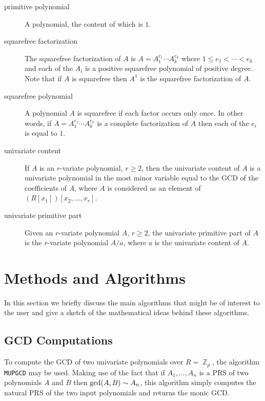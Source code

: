 \begin{description}
  \item[primitive polynomial]
 A polynomial, the content of which is
$1$.

  \item[squarefree
factorization]
 The squarefree factorization of $A$
is $A = A_1^{e_1}\cdots A_k^{e_k}$ where $1 \leq e_1 < \cdots < e_k$
and each of the $A_i$ is a positive squarefree polynomial of positive
degree.  Note that if $A$ is squarefree then $A^1$ is the
squarefree factorization of $A$.

  \item[squarefree polynomial]
 A polynomial $A$ is squarefree if each
factor occurs only once.  In other words, if $A = A_1^{e_1}\cdots
A_k^{e_k}$ is a complete factorization of $A$ then each of the $e_i$
is equal to $1$.

  \item[univariate content]
 If $A$ is an $r$-variate polynomial, $r
\geq 2$, then the univariate content of $A$ is a univariate polynomial
in the most minor variable equal to the GCD of the coefficients of
$A$, where $A$ is considered as an element of
$(R[x_1])[x_2,\ldots,x_r]$.

  \item[univariate primitive part]
 Given an $r$-variate polynomial
$A$, $r \geq 2$, the univariate primitive part of $A$ is the
$r$-variate polynomial $A/a$, where $a$ is the univariate content of
$A$.

\end{description}

\section{Methods and Algorithms}
In this section we briefly discuss the main algorithms that might be
of interest to the user and give a sketch of the mathematical ideas
behind these algorithms.

\subsection{GCD Computations}
To compute the GCD of two univariate polynomials over $R =\BbbZ_p$,
the algorithm {\tt MUPGCD} may be used. Making use of the fact that if
$A_1,\ldots,A_n$ is a PRS of two polynomials $A$ and $B$ then ${\rm
gcd}(A,B) \sim A_n$, this algorithm simply computes the natural PRS of
the two input polynomials and returns the monic GCD.

